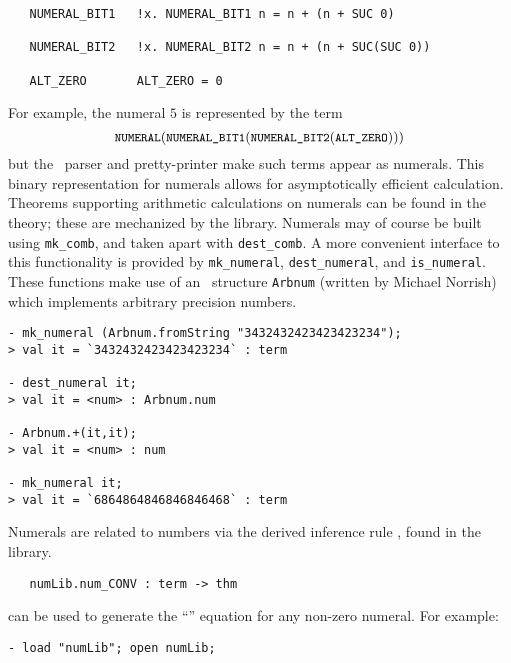 {\begin{verbatim}
   NUMERAL_BIT1   !x. NUMERAL_BIT1 n = n + (n + SUC 0)

   NUMERAL_BIT2   !x. NUMERAL_BIT2 n = n + (n + SUC(SUC 0))

   ALT_ZERO       ALT_ZERO = 0
\end{verbatim}

\noindent For example, the numeral $5$ is represented by the term
\[
   \ml{NUMERAL}(\ml{NUMERAL\_BIT1}(\ml{NUMERAL\_BIT2}(\ml{ALT\_ZERO})))
\]
but the \HOL\ parser and pretty-printer make such terms
appear as numerals. This binary representation for numerals allows for
asymptotically efficient calculation. Theorems supporting arithmetic
calculations on numerals can be found in the  theory;
these are mechanized by the  library. Numerals may of course
be built using {\small\verb+mk_comb+}, and taken apart with
{\small\verb+dest_comb+}. A more convenient interface to this
functionality is provided by {\small\verb+mk_numeral+},
{\small\verb+dest_numeral+}, and  {\small\verb+is_numeral+}. These
functions make use of an \ML\ structure {\small\verb+Arbnum+} (written by
Michael Norrish) which implements arbitrary precision numbers.

\setcounter{sessioncount}{1}
\begin{session}\begin{verbatim}
- mk_numeral (Arbnum.fromString "3432432423423423234");
> val it = `3432432423423423234` : term

- dest_numeral it;
> val it = <num> : Arbnum.num

- Arbnum.+(it,it);
> val it = <num> : num

- mk_numeral it;
> val it = `6864864846846846468` : term
\end{verbatim}\end{session}

Numerals are related to numbers via the derived inference rule
, found in the  library.

\begin{boxed}
\begin{verbatim}
   numLib.num_CONV : term -> thm
\end{verbatim}\end{boxed}

\noindent {} can be used to generate the ``''
equation for any non-zero numeral.  For example:

\setcounter{sessioncount}{1}
\begin{session}\begin{verbatim}
- load "numLib"; open numLib;


\end{verbatim}
\end{session}}
